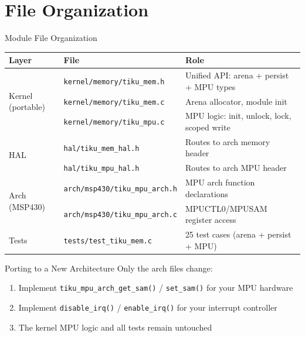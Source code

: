 \documentclass[aspectratio=169, 10pt]{beamer}
\begin{document}
\section{File Organization}

\begin{frame}[fragile]{Module File Organization}
\begin{table}
\centering
\small
\begin{tabular}{@{}lll@{}}
\toprule
\textbf{Layer} & \textbf{File} & \textbf{Role} \\
\midrule
\multirow{3}{*}{Kernel (portable)}
  & \texttt{kernel/memory/tiku\_mem.h}  & Unified API: arena + persist + MPU types \\
  & \texttt{kernel/memory/tiku\_mem.c}  & Arena allocator, module init \\
  & \texttt{kernel/memory/tiku\_mpu.c}  & MPU logic: init, unlock, lock, scoped write \\
\midrule
\multirow{2}{*}{HAL}
  & \texttt{hal/tiku\_mem\_hal.h}  & Routes to arch memory header \\
  & \texttt{hal/tiku\_mpu\_hal.h}  & Routes to arch MPU header \\
\midrule
\multirow{2}{*}{Arch (MSP430)}
  & \texttt{arch/msp430/tiku\_mpu\_arch.h} & MPU arch function declarations \\
  & \texttt{arch/msp430/tiku\_mpu\_arch.c} & MPUCTL0/MPUSAM register access \\
\midrule
Tests
  & \texttt{tests/test\_tiku\_mem.c} & 25 test cases (arena + persist + MPU) \\
\bottomrule
\end{tabular}
\end{table}

\vspace{0.5em}
\begin{block}{Porting to a New Architecture}
Only the arch files change:
\begin{enumerate}
  \item Implement \texttt{tiku\_mpu\_arch\_get\_sam()} / \texttt{set\_sam()} for your MPU hardware
  \item Implement \texttt{disable\_irq()} / \texttt{enable\_irq()} for your interrupt controller
  \item The kernel MPU logic and all tests remain untouched
\end{enumerate}
\end{block}
\end{frame}
\end{document}
